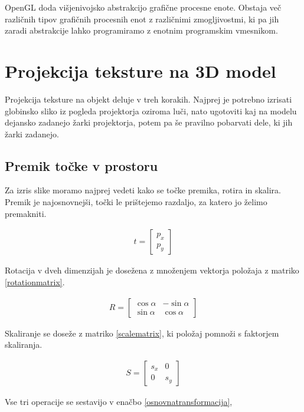 \documentclass[a4paper, 12pt]{book}
\begin{document}
OpenGL doda višjenivojsko abstrakcijo grafične procesne enote. Obstaja več različnih tipov grafičnih procesnih enot z različnimi zmogljivostmi, ki pa jih zaradi abstrakcije lahko programiramo z enotnim programskim vmesnikom. 
\section{Projekcija teksture na 3D model}

Projekcija teksture na objekt deluje v treh korakih. Najprej je potrebno izrisati globinsko sliko iz pogleda projektorja oziroma luči, nato ugotoviti kaj na modelu dejansko zadanejo žarki projektorja, potem pa še pravilno pobarvati dele, ki jih žarki zadanejo.

\subsection*{Premik točke v prostoru}

Za izris slike moramo najprej vedeti kako se točke premika, rotira in skalira. Premik je najosnovnejši, točki le prištejemo razdaljo, za katero jo želimo premakniti. 

\begin{align}
t
=
\begin{bmatrix}
p_x \\
p_y
\end{bmatrix}
\label{rotationmatrix}
\end{align}

Rotacija v dveh dimenzijah je dosežena z množenjem vektorja položaja z matriko \ref{rotationmatrix}.

\begin{align}
R
=
\begin{bmatrix}
\cos\alpha & -\sin\alpha \\
\sin\alpha & \cos\alpha
\end{bmatrix}
\label{rotationmatrix}
\end{align}


Skaliranje se doseže z matriko \ref{scalematrix}, ki položaj pomnoži s faktorjem skaliranja.

\begin{align}
S
=
\begin{bmatrix}
s_x & 0 \\
0 & s_y
\end{bmatrix}
\label{scalematrix}
\end{align}

Vse tri operacije se sestavijo v enačbo \ref{osnovnatransformacija},
\end{document}
